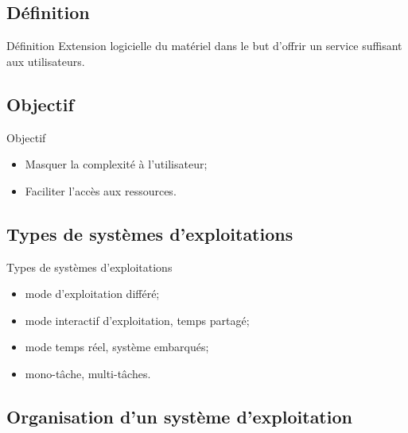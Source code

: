 \begin{frame}{\sectitle}

\def\subsectitle{Définition}
\subsection{\subsectitle}

\begin{exampleblock}{\subsectitle}
Extension logicielle du matériel dans le but d'offrir un service suffisant aux
utilisateurs.
\end{exampleblock}

\def\subsectitle{Objectif}
\subsection{\subsectitle}

\begin{block}{\subsectitle}
\begin{itemize}
    \item Masquer la complexité à l'utilisateur;
    \item Faciliter l'accès aux ressources.
\end{itemize}
\end{block}

\def\subsectitle{Types de systèmes d'exploitations}
\subsection{\subsectitle}

\begin{block}{\subsectitle}
\begin{itemize}
    \item mode d'exploitation différé;
    \item mode interactif d'exploitation, temps partagé;
    \item mode temps réel, système embarqués;
    \item mono-tâche, multi-tâches.
\end{itemize}
\end{block}
\end{frame}

\def\subsectitle{Organisation d'un système d'exploitation}
\subsection{\subsectitle}


